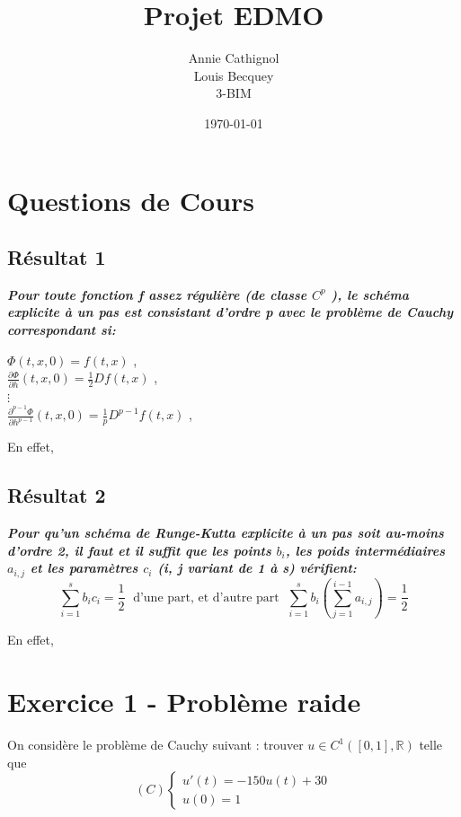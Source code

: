 \documentclass[a4paper,12pt,landscape]{article}
\begin{document}
\title{Projet EDMO}
\author{Annie Cathignol\\Louis Becquey\\3-BIM}
\date{\today}
\maketitle
\newpage

\section{Questions de Cours}
\subsection{Résultat 1}
{\it \bf Pour toute fonction f assez régulière (de classe $C^{p}$ ), le schéma explicite à un pas est consistant d’ordre p avec le problème de Cauchy correspondant si:}\\
\begin{center}
$\Phi (t,x,0) = f(t,x)$ ,  \\
$\frac{\partial \Phi}{\partial h} (t,x,0) = \frac{1}{2}Df(t,x)$ , \\
$\vdots$ \\
$\frac{\partial^{p-1}\Phi}{\partial h^{p-1}} (t,x,0) = \frac{1}{p}D^{p-1}f(t,x)$ , \\
\end{center}

En effet, 

\subsection{Résultat 2}
{\it \bf Pour qu’un schéma de Runge-Kutta explicite à un pas soit au-moins d’ordre 2, il faut et il suffit que les points $b_{i}$, les poids intermédiaires $a_{i,j}$ et les paramètres $c_{i}$ (i, j variant de 1 à s) vérifient:} $$\sum_{i=1}^{s}b_{i}c_{i} = \frac{1}{2} \; \textrm{   d'une part, et d'autre part   } \; \sum_{i=1}^{s}b_{i}(\sum_{j=1}^{i-1}a_{i,j})= \frac{1}{2}$$

En effet,

\section{Exercice 1 - Problème raide}
On considère le problème de Cauchy suivant :
trouver $u \in C^{1}([0,1], \mathbb{R} )$ telle que
$$
(C) \left \{
\begin{array}{l}
	u'(t)= -150u(t) + 30 \\
	u(0) = 1
\end{array}
\right.
$$
\newpage
\end{document}
